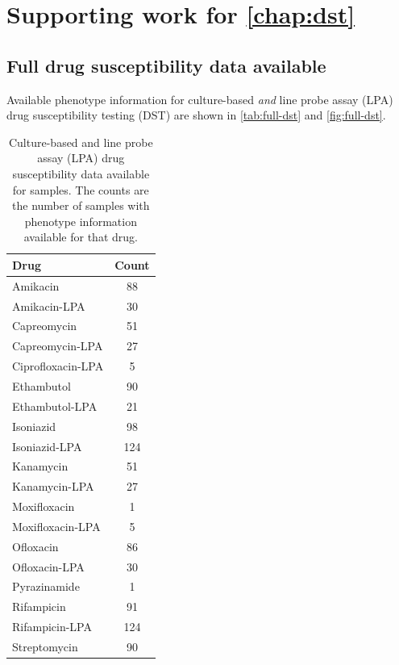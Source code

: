 \chapter{Supporting work for \autoref*{chap:dst}}

\section{Full drug susceptibility data available}
\label{sec:full-dst}

Available phenotype information for culture-based \emph{and} line probe assay (LPA) drug susceptibility testing (DST) are shown in \autoref{tab:full-dst} and \autoref{fig:full-dst}.

\begin{table}
\centering
\begin{tabular}{|l|c|}
\hline
Drug              & Count \\ \hline
Amikacin          & 88    \\ \hline
Amikacin-LPA      & 30    \\ \hline
Capreomycin       & 51    \\ \hline
Capreomycin-LPA   & 27    \\ \hline
Ciprofloxacin-LPA & 5     \\ \hline
Ethambutol        & 90    \\ \hline
Ethambutol-LPA    & 21    \\ \hline
Isoniazid         & 98    \\ \hline
Isoniazid-LPA     & 124   \\ \hline
Kanamycin         & 51    \\ \hline
Kanamycin-LPA     & 27    \\ \hline
Moxifloxacin      & 1     \\ \hline
Moxifloxacin-LPA  & 5     \\ \hline
Ofloxacin         & 86    \\ \hline
Ofloxacin-LPA     & 30    \\ \hline
Pyrazinamide      & 1     \\ \hline
Rifampicin        & 91    \\ \hline
Rifampicin-LPA    & 124   \\ \hline
Streptomycin      & 90    \\ \hline
\end{tabular}
\caption{Culture-based and line probe assay (LPA) drug susceptibility data available for samples. The counts are the number of samples with phenotype information available for that drug.}
\label{tab:full-dst}
\end{table}

